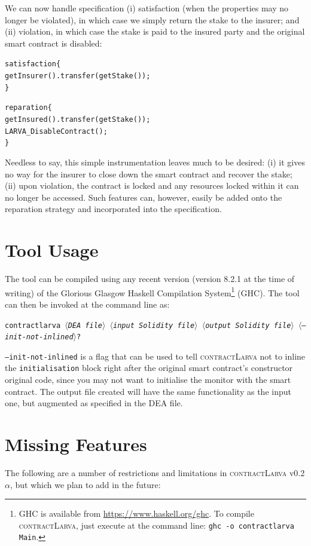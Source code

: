 \documentclass{article}
\newcommand{\contractlarva}{\textsc{contractLarva}\xspace}
\newcommand{\keyword}[1]{\textit{$\langle$#1$\rangle$}}
\begin{document}
    We can now handle specification (i) satisfaction (when the properties may no longer be violated), in which case we simply return the stake to the insurer; and (ii) violation, in which case the stake is paid to the insured party and the original smart contract is disabled:
    
    \small\begin{alltt}
    satisfaction \{
      getInsurer().transfer(getStake());      
    \}

    reparation \{
      getInsured().transfer(getStake());
      LARVA\_DisableContract();
    \}
    \end{alltt}\normalsize
  
    Needless to say, this simple instrumentation leaves much to be desired: (i) it gives no way for the insurer to close down the smart contract and recover the stake; (ii) upon violation, the contract is locked and any resources locked within it can no longer be accessed. Such features can, however, easily be added onto the reparation strategy and incorporated into the specification.
    
  \section{Tool Usage}
  The tool can be compiled using any recent version (version 8.2.1 at the time of writing) of the Glorious Glasgow Haskell Compilation System\footnote{GHC is available from \url{https://www.haskell.org/ghc}. To compile \contractlarva, just execute at the command line: \texttt{ghc -o contractlarva Main}.} (GHC). The tool can then be invoked at the command line as:
  
  \smallskip\centerline{\texttt{contractlarva \keyword{DEA file} \keyword{input Solidity file} \keyword{output Solidity file} \keyword{--init-not-inlined}?}}
  
  \smallskip \texttt{--init-not-inlined} is a flag that can be used to tell \contractlarva not to inline the \texttt{initialisation} block right after the original smart contract's constructor original code, since you may not want to initialise the monitor with the smart contract.
  \smallskip The output file created will have the same functionality as the input one, but augmented as specified in the DEA file.
  
  \section{Missing Features}
  \label{s:extensions}
  The following are a number of restrictions and limitations in \contractlarva v0.2$\alpha$, but which we plan to add in the future:
  
\end{document}

